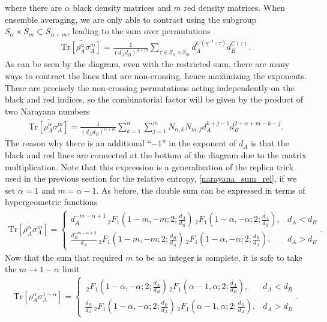 \documentclass[a4paper,11pt]{article}
\newcommand{\Tr}{\text{Tr}}
\begin{document}
where there are $\alpha$ black density matrices and $m$ red density matrices. When ensemble averaging, we are only able to contract using the subgroup $S_{\alpha}\times S_m \subset S_{\alpha + m}$, leading to the sum over permutations 
\begin{align}
     \overline{\Tr\left[ \rho_A^{{\alpha}} \sigma_A^{m}\right]} = \frac{1}{(d_A d_B)^{{\alpha}+m}}\sum_{\tau \in S_{\alpha} \times S_m} d_A^{C(\eta^{-1}\circ \tau)}d_B^{C(\tau)}.
\end{align}
As can be seen by the diagram, even with the restricted sum, there are many ways to contract the lines that are non-crossing, hence maximizing the exponents. These are precisely the non-crossing permutations acting independently on the black and red indices, so the combinatorial factor will be given by the product of two Narayana numbers
\begin{align}
   \overline{\Tr\left[ \rho_A^{{\alpha}} \sigma_A^{m}\right]} = \frac{1}{(d_A d_B)^{{\alpha}+m}}\sum_{k = 1}^{\alpha}\sum_{j = 1}^m N_{\alpha,k}N_{m,j}d_A^{k+j-1} d_B^{2+\alpha + m-k-j}.
\end{align}
The reason why there is an additional ``$-1$'' in the exponent of $d_A$ is that the black and red lines are connected at the bottom of the diagram due to the matrix multiplication.
Note that this expression is a generalization of the replica trick used in the previous section for the relative entropy, \eqref{narayana_sum_rel}, if we set $\alpha = 1$ and $m = \alpha-1$. As before, the double sum can be expressed in terms of hypergeometric functions
\begin{align}
     \overline{\Tr\left[ \rho_A^{{\alpha}} \sigma_A^{m}\right]} =\begin{cases} d_A^{-m-{\alpha}+1} \, _2F_1\left(1-m,-m;2;\frac{d_A}{d_B}\right) \,
   _2F_1\left(1-{\alpha},-{\alpha};2;\frac{d_A}{d_B}\right), & d_A < d_B
   \\
 \frac{d_B^{-m-{\alpha}+2}}{d_A} \, _2F_1\left(1-m,-m;2;\frac{d_B}{d_A}\right) \,
   _2F_1\left(1-{\alpha},-{\alpha};2;\frac{d_B}{d_A}\right), & d_A > d_B
   \end{cases}.
\end{align}
Now that the sum that required $m$ to be an integer is complete, it is safe to take the $m \rightarrow 1-\alpha $ limit
\begin{align}
    \overline{\Tr\left[ \rho_A^{\alpha} \sigma_A^{1-{\alpha}}\right]} = \begin{cases}\, _2F_1\left(1-{\alpha},-{\alpha};2;\frac{d_A}{d_B}\right) \,
   _2F_1\left({\alpha}-1,{\alpha};2;\frac{d_A}{d_B}\right), & d_A < d_B
   \\
   \frac{d_B}{d_A} \, _2F_1\left(1-{\alpha},-{\alpha};2;\frac{d_B}{d_A}\right) \,
   _2F_1\left({\alpha}-1,{\alpha};2;\frac{d_B}{d_A}\right) , & d_A > d_B
   \end{cases}.
   \label{PRRE_pre_eq_replica}
\end{align}
\end{document}
